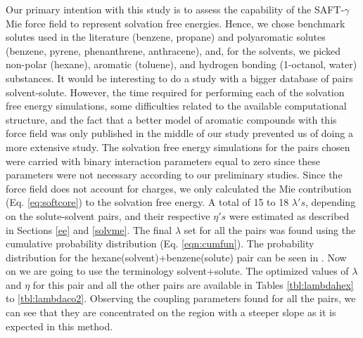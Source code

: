 Our primary intention with this study is to assess the capability of the SAFT-$\gamma$ Mie force field to represent solvation free energies. Hence, we chose benchmark solutes used in the literature (benzene, propane) and polyaromatic solutes (benzene, pyrene, phenanthrene, anthracene), and, for the solvents, we picked non-polar (hexane), aromatic (toluene), and hydrogen bonding (1-octanol, water) substances. It would be interesting to do a study with a bigger database of pairs solvent-solute. However, the time required for performing each of the solvation free energy simulations, some difficulties related to the available computational structure, and the fact that a better model of aromatic compounds with this force field was only published in the middle of our study prevented us of doing a more extensive study. The solvation free energy simulations for the pairs chosen were carried with binary interaction parameters equal to zero since these parameters were not necessary according to our preliminary studies. Since the force field does not account for charges, we only calculated the Mie contribution (Eq. \eqref{eq:softcore}) to the solvation free energy. A total of 15 to 18 $\lambda 's$, depending on the solute-solvent pairs, and their respective $\eta 's$ were estimated as described in Sections \ref{ee} and \ref{solvme}. The final $\lambda$ set for all the pairs was found using the cumulative probability distribution (Eq. \eqref{eqn:cumfun}). The probability distribution for the hexane(solvent)+benzene(solute) pair can be seen in . Now on we are going to use the terminology solvent+solute. The optimized values of $\lambda$ and $\eta$ for this pair and all the other pairs are available in Tables \ref{tbl:lambdahex} to \ref{tbl:lambdaco2}. Observing the coupling parameters found for all the pairs, we can see that they are concentrated on the region with a steeper slope as it is expected in this method.


